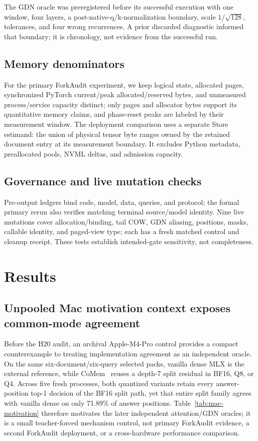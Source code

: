 \documentclass{article}
\begin{document}
The GDN oracle was preregistered before its successful execution with one
window, four layers, a post-native-q/k-normalization boundary, scale
$1/\sqrt{128}$, tolerances, and four wrong recurrences.  A prior discarded
diagnostic informed that boundary; it is chronology, not evidence from the
successful run.

\subsection{Memory denominators}
\label{sec:denominators}

For the primary ForkAudit experiment, we keep logical state, allocated pages,
synchronized PyTorch current/peak allocated/reserved bytes, and unmeasured
process/service capacity distinct; only pages and allocator bytes support its
quantitative memory claims, and phase-reset peaks are labeled by their
measurement window.  The deployment comparison uses a separate Store
estimand: the union of physical tensor byte ranges owned by the retained
document entry at its measurement boundary.  It excludes Python metadata,
preallocated pools, NVML deltas, and admission capacity.

\subsection{Governance and live mutation checks}

Pre-output ledgers bind code, model, data, queries, and protocol; the formal
primary rerun also verifies matching terminal source/model identity.  Nine live
mutations cover allocation/binding, tail COW, GDN aliasing, positions, masks,
callable identity, and paged-view type; each has a fresh matched control and
cleanup receipt.  These tests establish intended-gate sensitivity, not
completeness.

\section{Results}
\label{sec:results}

\subsection{Unpooled Mac motivation context exposes common-mode agreement}

Before the H20 audit, an archival Apple-M4-Pro control provides a compact
counterexample to treating implementation agreement as an independent oracle.
On the same six-document/six-query selected packs, vanilla dense MLX is the
external reference, while CoMem~\citep{liu2026comem,liu2026understanding}
reuses a depth-7 split residual in BF16, Q8, or Q4.  Across five fresh
processes, both quantized variants retain every answer-position top-1 decision
of the BF16 split path, yet that entire split family agrees with vanilla dense
on only 71.89\% of answer positions.  Table~\ref{tab:mac-motivation} therefore
motivates the later independent attention/GDN oracles; it is a small
teacher-forced mechanism control, not primary ForkAudit evidence, a second
ForkAudit deployment, or a cross-hardware performance comparison.
\end{document}
